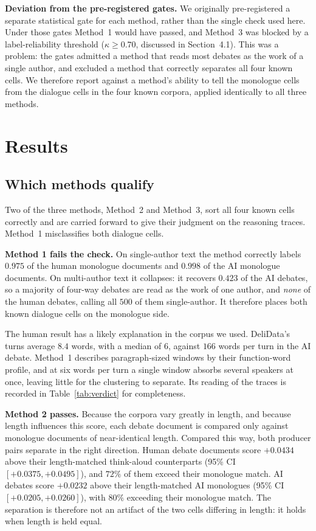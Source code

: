 \documentclass[10pt,twocolumn]{article}
\begin{document}
\textbf{Deviation from the pre-registered gates.} We originally pre-registered a separate statistical
gate for each method, rather than the single check used here. Under those gates Method~1 would have
passed, and Method~3 was blocked by a label-reliability threshold ($\kappa \ge 0.70$, discussed in
Section~4.1). This was a problem: the gates admitted a method that reads most debates as the work of
a single author, and excluded a method that correctly separates all four known cells. We therefore
report against a method's ability to tell the monologue cells from the dialogue cells in the four
known corpora, applied identically to all three methods.

\section{Results}

\subsection{Which methods qualify}
Two of the three methods, Method~2 and Method~3, sort all four known cells correctly and are carried
forward to give their judgment on the reasoning traces. Method~1 misclassifies both dialogue cells.

\textbf{Method 1 fails the check.} On single-author text the method correctly labels $0.975$ of the
human monologue documents and $0.998$ of the AI monologue documents. On
multi-author text it collapses: it recovers $0.423$ of the AI debates, so a majority of four-way
debates are read as the work of one author, and \emph{none} of the human debates, calling all $500$
of them single-author. It therefore places both known dialogue cells on the monologue side.

The human result has a likely explanation in the corpus we used. DeliData's turns average $8.4$
words, with a median of $6$, against $166$ words per turn in the AI debate. Method~1 describes
paragraph-sized windows by their function-word profile, and at six words per turn a single window
absorbs several speakers at once, leaving little for the clustering to separate. Its reading of the
traces is recorded in Table~\ref{tab:verdict} for completeness.

\textbf{Method 2 passes.} Because the corpora vary greatly in length, and because length influences
this score, each debate document is compared only against monologue documents of near-identical
length. Compared this way, both producer pairs separate in the right direction. Human debate
documents score $+0.0434$ above their length-matched think-aloud counterparts (95\% CI
$[+0.0375,+0.0495]$), and $72\%$ of them exceed their monologue match. AI debates score $+0.0232$
above their length-matched AI monologues (95\% CI $[+0.0205,+0.0260]$), with $80\%$ exceeding their
monologue match. The separation is therefore not an artifact of the two cells differing in length: it
holds when length is held equal.
\end{document}
